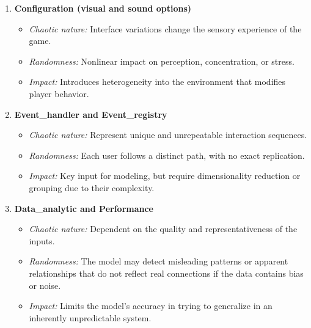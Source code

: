 \documentclass{article}
\begin{document}
\begin{enumerate}
    \item \textbf{Configuration (visual and sound options)}
    \begin{itemize}
        \item \textit{Chaotic nature:} Interface variations change the 
        sensory experience of the game.
        \item \textit{Randomness:} Nonlinear impact on perception, 
        concentration, or stress.
        \item \textit{Impact:} Introduces heterogeneity into the 
        environment that modifies player behavior.
    \end{itemize}
    
    \item \textbf{Event\_handler and Event\_registry}
    \begin{itemize}
        \item \textit{Chaotic nature:} Represent unique and unrepeatable 
        interaction sequences.
        \item \textit{Randomness:} Each user follows a distinct path, with 
        no exact replication.
        \item \textit{Impact:} Key input for modeling, but require 
        dimensionality reduction or grouping due to their complexity.
    \end{itemize}
    
    \item \textbf{Data\_analytic and Performance}
    \begin{itemize}
        \item \textit{Chaotic nature:} Dependent on the quality and 
        representativeness of the inputs.
        \item \textit{Randomness:} The model may detect misleading 
        patterns or apparent relationships that do not reflect real 
        connections if the data contains bias or noise.
        \item \textit{Impact:} Limits the model's accuracy in trying to 
        generalize in an inherently unpredictable system.
    \end{itemize}
\end{enumerate}
\end{document}
